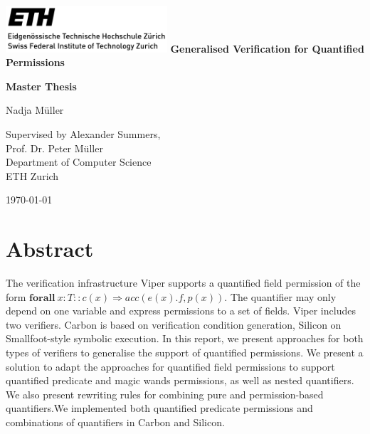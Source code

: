 \documentclass[12pt]{article}
\begin{document}
\clearpage
\newcommand*{\ident}{\hspace*{0.5cm}}
\newcommand{\wand}{\ensuremath{\mathbin{-\!\!*}}}

\begin{titlepage}
	\includegraphics[width=6cm]{eth_logo_black.pdf}
	\vfill
	\centering
    \vspace*{1cm}
    \Huge\textbf{Generalised Verification for Quantified Permissions}

    \vspace*{2cm}
    \Large\textbf{Master Thesis}
    
    \vspace*{1cm}
    \Large Nadja M\"uller
    
    \vspace*{0.5cm}
    Supervised by Alexander Summers,\\
    Prof. Dr. Peter M\"uller \\
    Department of Computer Science \\
    ETH Zurich
    
    \vspace*{0.5cm}
    \today
    
	\vfill

    \raggedright
   	
\end{titlepage}

\newpage

\clearpage
{}
\tableofcontents
\newpage
\clearpage
{}%
\section{Abstract}
The verification infrastructure Viper supports a quantified field permission of the form \(\mathbf{forall\ } x:T :: c(x) \Rightarrow acc(e(x).f, p(x))\). The quantifier may only depend on one variable and express permissions to a set of fields. Viper includes two verifiers. Carbon is based on verification condition generation, Silicon on Smallfoot-style symbolic execution. In this report, we present approaches for both types of verifiers to generalise the support of quantified permissions. We present a solution to adapt the approaches for quantified field permissions to support quantified predicate and magic wands permissions, as well as nested quantifiers. We also present rewriting rules for combining pure and permission-based quantifiers.We implemented both quantified predicate permissions and combinations of quantifiers in Carbon and Silicon.
\end{document}
